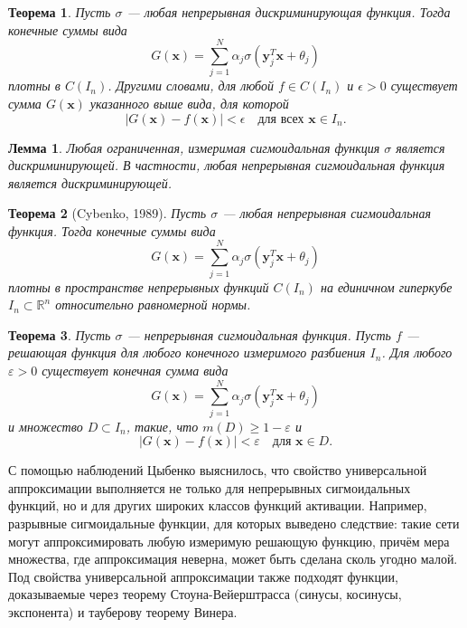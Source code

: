 \documentclass[12pt]{article}
\newtheorem{theorem}{Теорема}
\newtheorem{lemma}{Лемма}
\begin{document}
	\begin{theorem}
		Пусть $\sigma$ — любая непрерывная дискриминирующая функция. Тогда конечные суммы вида
		\[
		G(\mathbf{x}) = \sum_{j=1}^N \alpha_j \sigma(\mathbf{y}_j^T\mathbf{x} + \theta_j)
		\]
		плотны в $C(I_n)$. Другими словами, для любой $f \in C(I_n)$ и $\epsilon > 0$ существует сумма $G(\mathbf{x})$ указанного выше вида, для которой
		\[
		|G(\mathbf{x}) - f(\mathbf{x})| < \epsilon \quad \text{для всех } \mathbf{x} \in I_n.
		\]
	\end{theorem}
	
	\begin{lemma}
		Любая ограниченная, измеримая сигмоидальная функция $\sigma$ является дискриминирующей. В частности, любая непрерывная сигмоидальная функция является дискриминирующей.
	\end{lemma}
	
	\begin{theorem}[Cybenko, 1989]
		Пусть $\sigma$ --- любая непрерывная сигмоидальная функция. Тогда конечные суммы вида
		\[
		G(\mathbf{x}) = \sum_{j=1}^N \alpha_j \sigma(\mathbf{y}_j^T\mathbf{x} + \theta_j)
		\]
		плотны в пространстве непрерывных функций $C(I_n)$ на единичном гиперкубе $I_n \subset \mathbb{R}^n$ относительно равномерной нормы.
	\end{theorem}
	
	\begin{theorem}
		Пусть $\sigma$ — непрерывная сигмоидальная функция. Пусть $f$ — решающая функция для любого конечного измеримого разбиения $I_n$. Для любого $\varepsilon > 0$ существует конечная сумма вида
		\[
		G(\mathbf{x}) = \sum_{j=1}^N \alpha_j \sigma(\mathbf{y}_j^T\mathbf{x} + \theta_j)
		\]
		и множество $D \subset I_n$, такие, что $m(D) \geq 1 - \varepsilon$ и
		\[
		|G(\mathbf{x}) - f(\mathbf{x})| < \varepsilon \quad \text{для } \mathbf{x} \in D.
		\]
	\end{theorem}
	
	С помощью наблюдений Цыбенко выяснилось, что свойство универсальной аппроксимации выполняется не только для непрерывных сигмоидальных функций, но и для других широких классов функций активации. Например, разрывные сигмоидальные функции, для которых выведено следствие: такие сети могут аппроксимировать любую измеримую решающую функцию, причём мера множества, где аппроксимация неверна, может быть сделана сколь угодно малой. Под свойства универсальной аппроксимации также подходят функции, доказываемые через теорему Стоуна-Вейерштрасса (синусы, косинусы, экспонента) и тауберову теорему Винера.
	
\end{document}
